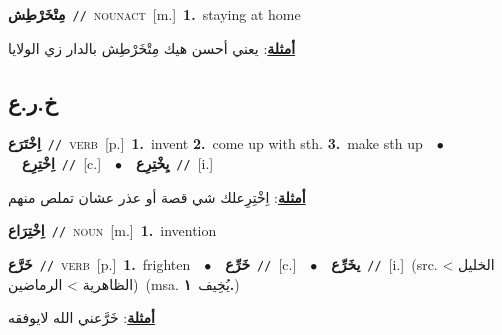 \documentclass[10pt,a4paper,twoside]{article} %
\begin{document}
\begin{multicols}{2}
{\setlength\topsep{0pt}\textbf{\foreignlanguage{arabic}{مِتْخَرْطِش}}\ {\color{gray}\texttt{//}\color{black}}\ \textsc{noun\textunderscore act}\ [m.]\ \textbf{1.}~staying at home\  \begin{flushright}\color{gray}\foreignlanguage{arabic}{\textbf{\underline{\foreignlanguage{arabic}{أمثلة}}}: يعني أحسن هيك مِتْخَرْطِش بالدار زي الولايا}\end{flushright}\color{black}} \vspace{2mm}

\vspace{-3mm}
\subsection*{\color{blue}\foreignlanguage{arabic}{خ.ر.ع}\color{blue}{}} 

{\setlength\topsep{0pt}\textbf{\foreignlanguage{arabic}{اِخْتَرَع}}\ {\color{gray}\texttt{//}\color{black}}\ \textsc{verb}\ [p.]\ \textbf{1.}~invent  \textbf{2.}~come up with sth.  \textbf{3.}~make sth up\ \ $\bullet$\ \ \setlength\topsep{0pt}\textbf{\foreignlanguage{arabic}{اِخْتِرِع}}\ {\color{gray}\texttt{//}\color{black}}\ [c.]\ \ $\bullet$\ \ \setlength\topsep{0pt}\textbf{\foreignlanguage{arabic}{يِخْتِرِع}}\ {\color{gray}\texttt{//}\color{black}}\ [i.]\  \begin{flushright}\color{gray}\foreignlanguage{arabic}{\textbf{\underline{\foreignlanguage{arabic}{أمثلة}}}: اِخْتِرِعلك شي قصة أو عذر عشان تملص منهم}\end{flushright}\color{black}} \vspace{2mm}

{\setlength\topsep{0pt}\textbf{\foreignlanguage{arabic}{اِخْتِرَاع}}\ {\color{gray}\texttt{//}\color{black}}\ \textsc{noun}\ [m.]\ \textbf{1.}~invention\ } \vspace{2mm}

{\setlength\topsep{0pt}\textbf{\foreignlanguage{arabic}{خَرَّع}}\ {\color{gray}\texttt{//}\color{black}}\ \textsc{verb}\ [p.]\ \textbf{1.}~frighten\ \ $\bullet$\ \ \setlength\topsep{0pt}\textbf{\foreignlanguage{arabic}{خَرِّع}}\ {\color{gray}\texttt{//}\color{black}}\ [c.]\ \ $\bullet$\ \ \setlength\topsep{0pt}\textbf{\foreignlanguage{arabic}{يخَرِّع}}\ {\color{gray}\texttt{//}\color{black}}\ [i.]\ (src. \color{gray}\foreignlanguage{arabic}{الخليل > الظاهرية > الرماضين}\color{black})\ \color{gray}(msa. \foreignlanguage{arabic}{يُخِيف}~\foreignlanguage{arabic}{\textbf{١.}})\color{black}\  \begin{flushright}\color{gray}\foreignlanguage{arabic}{\textbf{\underline{\foreignlanguage{arabic}{أمثلة}}}: خَرَّعني الله لايوفقه}\end{flushright}\color{black}} \vspace{2mm}


\end{multicols}
\end{document}
